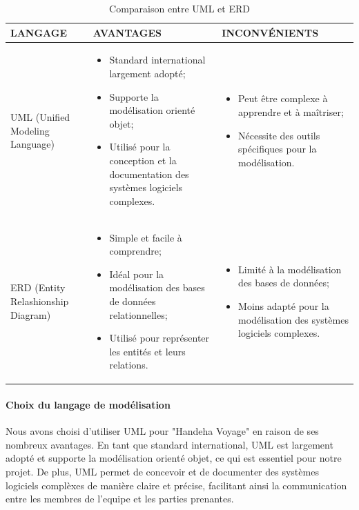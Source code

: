 \documentclass[12pt]{report}
\begin{document}
				
				\begin{longtable}{|p{3cm}|p{5.5cm}|p{5.5cm}|} 
						\caption{Comparaison entre UML et ERD} 
						\label{tab:Lmodel}\\ 
						\hline 
						LANGAGE & AVANTAGES & INCONVÉNIENTS\\ 
						\hline 
						\endfirsthead 	
						\endhead
						UML (Unified Modeling Language) &
						\begin{itemize}
							\item Standard international largement adopté;
							\item Supporte la modélisation orienté objet;
							\item Utilisé pour la conception et la documentation des systèmes logiciels complexes.
						\end{itemize}
						&
						\begin{itemize}
							\item Peut être complexe à apprendre et à maîtriser; 
							\item Nécessite des outils spécifiques pour la modélisation.
						\end{itemize}\\						
						\hline
						ERD (Entity Relashionship Diagram) &
						\begin{itemize}
							\item Simple et facile à comprendre;
							\item Idéal pour la modélisation des bases de données relationnelles;
							\item Utilisé pour représenter les entités et leurs relations.
						\end{itemize} &
						\begin{itemize}
							\item Limité à la modélisation des bases de données;
							\item Moins adapté pour la modélisation des systèmes logiciels complexes.
						\end{itemize} \\
						\hline
				    \end{longtable}

				\paragraph{Choix du langage de modélisation} 
			
				Nous avons choisi d'utiliser UML pour "Handeha Voyage" en raison de ses nombreux avantages. En tant que standard international, UML est largement adopté et supporte la modélisation orienté objet, ce qui est essentiel pour notre projet. De plus, UML permet de concevoir et de documenter des systèmes logiciels complèxes de manière claire et précise, facilitant ainsi la communication entre les membres de l'equipe et les parties prenantes.
\end{document}
